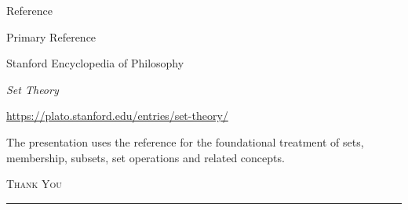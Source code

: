 \documentclass[aspectratio=169,11pt]{beamer}
\begin{document}

\begin{frame}{Reference}

\begin{block}{Primary Reference}

Stanford Encyclopedia of Philosophy

\vspace{0.15cm}

\textit{Set Theory}

\vspace{0.15cm}

\url{https://plato.stanford.edu/entries/set-theory/}

\end{block}

\vspace{0.4cm}

The presentation uses the reference for the foundational
treatment of sets, membership, subsets, set operations and
related concepts.

\end{frame}


\begin{frame}[plain]

\vspace{1.5cm}

\begin{center}

{\Huge
\color{MathGreen}
\textsc{Thank You}
}

\vspace{0.4cm}

{\color{MathPeach}
\rule{0.28\textwidth}{1.5pt}
}

\vspace{0.4cm}

\end{center}

\end{frame}

\end{document}
